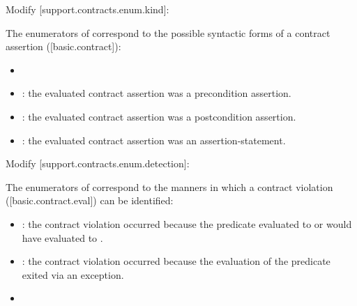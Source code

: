 Modify [support.contracts.enum.kind]:

\begin{adjustwidth}{0.5cm}{0.5cm}
The enumerators of  correspond to the possible syntactic forms of a contract assertion ([basic.contract]):
\begin{itemize}
\item {}
\item {}: the evaluated contract assertion was a precondition assertion.
\item {}: the evaluated contract assertion was a postcondition assertion.
\item {}: the evaluated contract assertion was an assertion-statement.
\end{itemize}
\end{adjustwidth}

Modify [support.contracts.enum.detection]:

\begin{adjustwidth}{0.5cm}{0.5cm}
The enumerators of  correspond to the manners in which a contract violation ([basic.contract.eval]) can be identified:
\begin{itemize}
\item {}: the contract violation occurred because the predicate evaluated to  or would have evaluated to .
\item {}: the contract violation occurred because the evaluation of the predicate exited via an exception.
\item {}
\end{itemize}
\end{adjustwidth}




\pagebreak
\renewcommand{\addcontentsline}[3]{}%






